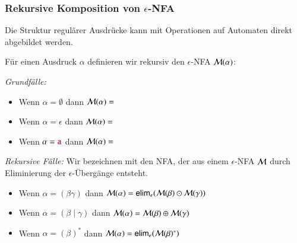 \documentclass[onlymath]{beamer}
\begin{document}
\begin{frame}\frametitle{Rekursive Komposition von $\epsilon$-NFA}

Die Struktur regulärer Ausdrücke kann mit Operationen auf Automaten direkt abgebildet werden.
\medskip\pause

\alert{Für einen Ausdruck $\alpha$ definieren wir rekursiv den $\epsilon$-NFA $\mathcal{M}(\alpha)$:}
\medskip

\emph{Grundfälle:}
\begin{itemize}
\item Wenn $\alpha=\emptyset$ dann $\mathcal{M}(\alpha)={}$ 
%
\item Wenn $\alpha=\epsilon$ dann $\mathcal{M}(\alpha)={}$ 
\item Wenn $\alpha=\mathtt{\textcolor{purple}{a}}$ dann $\mathcal{M}(\alpha)={}$ 
\end{itemize}\pause

\emph{Rekursive Fälle:}
Wir bezeichnen mit  den NFA, der aus einem $\epsilon$-NFA $\mathcal{M}$ durch Eliminierung der $\epsilon$-Übergänge entsteht.
\begin{itemize}
\item Wenn $\alpha=(\beta\gamma)$ dann $\mathcal{M}(\alpha)=\textsf{elim}_\epsilon(\mathcal{M}(\beta)\odot\mathcal{M}(\gamma))$
\item Wenn $\alpha=(\beta\mid\gamma)$ dann $\mathcal{M}(\alpha)=\mathcal{M}(\beta)\oplus\mathcal{M}(\gamma)$
\item Wenn $\alpha=(\beta)^*$ dann $\mathcal{M}(\alpha)=\textsf{elim}_\epsilon(\mathcal{M}(\beta)^*)$
\end{itemize}

\end{frame}
\end{document}
